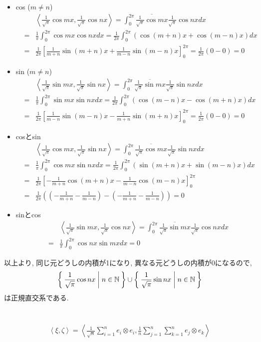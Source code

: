 \documentclass[a4paper,11pt]{jsarticle}
\begin{document}
\begin{itemize}
  \item cos ($m \neq n$)
    \begin{eqnarray*}
      && \left<\frac{1}{\sqrt{\pi}}\cos{mx}, \frac{1}{\sqrt{\pi}}\cos{nx}\right>
      = \int_{0}^{2\pi}{\overline{\frac{1}{\sqrt{\pi}}\cos{mx}}\frac{1}{\sqrt{\pi}}\cos{nx}}dx \\
      &=& \frac{1}{\pi}\int_{0}^{2\pi}{\cos{mx}\cos{nx}}dx
      = \frac{1}{2\pi}\int_{0}^{2\pi}{\left(\cos{(m + n)x} + \cos{(m - n)x}\right)}dx \\
      &=& \frac{1}{2\pi}\left[\frac{1}{m + n}\sin{(m + n)x} + \frac{1}{m - n}\sin{(m - n)x}\right]_{0}^{2\pi}
      = \frac{1}{2\pi}\left(0 - 0\right) = 0
    \end{eqnarray*}
  \item sin ($m \neq n$)
    \begin{eqnarray*}
      && \left<\frac{1}{\sqrt{\pi}}\sin{mx}, \frac{1}{\sqrt{\pi}}\sin{nx}\right>
      = \int_{0}^{2\pi}{\overline{\frac{1}{\sqrt{\pi}}\sin{mx}}\frac{1}{\sqrt{\pi}}\sin{nx}}dx \\
      &=& \frac{1}{\pi}\int_{0}^{2\pi}{\sin{mx}\sin{nx}}dx
      = \frac{1}{2\pi}\int_{0}^{2\pi}{\left(\cos{(m - n)x} - \cos{(m + n)x}\right)}dx \\
      &=& \frac{1}{2\pi}\left[\frac{1}{m - n}\sin{(m - n)x} - \frac{1}{m + n}\sin{(m + n)x}\right]_{0}^{2\pi}
      = \frac{1}{2\pi}\left(0 - 0\right) = 0
    \end{eqnarray*}
  \item cosとsin
    \begin{eqnarray*}
      && \left<\frac{1}{\sqrt{\pi}}\cos{mx}, \frac{1}{\sqrt{\pi}}\sin{nx}\right>
      = \int_{0}^{2\pi}{\overline{\frac{1}{\sqrt{\pi}}\cos{mx}}\frac{1}{\sqrt{\pi}}\sin{nx}}dx \\
      &=& \frac{1}{\pi}\int_{0}^{2\pi}{\cos{mx}\sin{nx}}dx
      = \frac{1}{2\pi}\int_{0}^{2\pi}{\left(\sin{(m + n)x} + \sin{(m - n)x}\right)}dx \\
      &=& \frac{1}{2\pi}\left[-\frac{1}{m + n}\cos{(m + n)x} - \frac{1}{m - n}\cos{(m - n)x}\right]_{0}^{2\pi} \\
      &=& \frac{1}{2\pi}\left(\left(-\frac{1}{m + n} -\frac{1}{m - n}\right)-\left(-\frac{1}{m + n} -\frac{1}{m - n}\right)\right) = 0
    \end{eqnarray*}
  \item sinとcos
    \begin{eqnarray*}
      && \left<\frac{1}{\sqrt{\pi}}\sin{mx}, \frac{1}{\sqrt{\pi}}\cos{nx}\right>
      = \int_{0}^{2\pi}{\overline{\frac{1}{\sqrt{\pi}}\sin{mx}}\frac{1}{\sqrt{\pi}}\cos{nx}}dx \\
      &=& \frac{1}{\pi}\int_{0}^{2\pi}{\cos{nx}\sin{mx}}dx
      = 0
    \end{eqnarray*}
\end{itemize}
以上より, 同じ元どうしの内積が1になり, 
異なる元どうしの内積が0になるので, 
\[
  \Set{\frac{1}{\sqrt{\pi}}\cos{nx} | n \in \mathbb{N}}
  \cup \Set{\frac{1}{\sqrt{\pi}}\sin{nx} | n \in \mathbb{N}}
\]
は正規直交系である.

\section{}
\begin{eqnarray*}
  \left<\xi, \zeta\right>
  = \left<
    \frac{1}{\sqrt{n}}\sum_{i=1}^{n}e_i \otimes e_i,
    \frac{1}{n}\sum_{j=1}^{n}\sum_{k=1}^{n}e_j \otimes e_k
  \right>
\end{eqnarray*}
\end{document}
